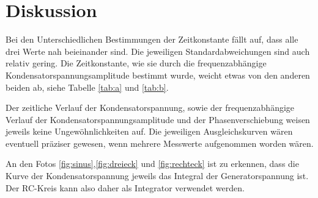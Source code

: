 \section{Diskussion}
\label{sec:Diskussion}

Bei den Unterschiedlichen Bestimmungen der Zeitkonstante fällt auf, dass alle drei Werte nah beieinander sind. Die jeweiligen 
Standardabweichungen sind auch relativ gering. Die Zeitkonstante, wie sie durch die frequenzabhängige Kondensatorspannungsamplitude 
bestimmt wurde, weicht etwas von den anderen beiden ab, siehe Tabelle \ref{tab:a} und \ref{tab:b}.

Der zeitliche Verlauf der Kondensatorspannung, sowie der frequenzabhängige Verlauf der Kondensatorspannungsamplitude und der
Phasenverschiebung weisen jeweils keine Ungewöhnlichkeiten auf. Die jeweiligen Ausgleichskurven wären eventuell präziser
gewesen, wenn mehrere Messwerte aufgenommen worden wären. 

An den Fotos \ref{fig:sinus},\ref{fig:dreieck} und \ref{fig:rechteck} ist zu erkennen, dass die Kurve der Kondensatorspannung jeweils
das Integral der Generatorspannung ist. Der RC-Kreis kann also daher als Integrator verwendet werden. 




